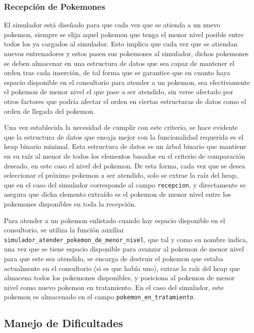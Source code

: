 \documentclass[titlepage,a4paper]{article}
\begin{document}
\subsubsection{Recepción de Pokemones}

El simulador está diseñado para que cada vez que se atienda a un nuevo pokemon,
siempre se elija aquel pokemon que tenga el menor nivel posible entre todos los
ya cargados al simulador. Esto implica que cada vez que se atiendan nuevos
entrenadores y estos pasen sus pokemones al simulador, dichos pokemones se 
deben almacenar en una estructura de datos que sea capaz de mantener el orden
tras cada inserción, de tal forma que se garantice que en cuanto haya espacio
disponible en el consultorio para atender a un pokemon, sea efectivamente el 
pokemon de menor nivel el que pase a ser atendido, sin verse afectado por otros
factores que podría afectar el orden en ciertas estructuras de datos como el
orden de llegada del pokemon.

Una vez establecida la necesidad de cumplir con este criterio, se hace evidente
que la estructura de datos que encaja mejor con la funcionalidad requerida es 
el heap binario minimal. Esta estructura de datos es un árbol binario que
mantiene en su raíz al menor de todos los elementos basados en el criterio de
comparación deseado, en este caso el nivel del pokemon. De esta forma, cada vez
que se desea seleccionar el próximo pokemon a ser atendido, solo se extrae la
raíz del heap, que en el caso del simulador corresponde al campo
\lstinline{recepcion}, y directamente se asegura que dicha elemento extraído
es el pokemon de menor nivel entre los pokemones disponibles en toda la
recepción.

Para atender a un pokemon enlistado cuando hay espacio disponible en el
consultorio, se utiliza la función auxiliar
\lstinline{simulador_atender_pokemon_de_menor_nivel}, que tal y como su nombre
indica, una vez que se tiene espacio disponible para avanzar al pokemon de menor
nivel para que este sea atendido, se encarga de destruir el pokemon que estaba
actualmente en el consultorio (si es que había uno), extrae la raíz del heap
que almacena todos los pokemones disponibles, y posiciona al pokemon de menor
nivel como nuevo pokemon en tratamiento. En el caso del simulador, este pokemon
es almacenado en el campo \lstinline{pokemon_en_tratamiento}.

\subsection{Manejo de Dificultades}
\end{document}
